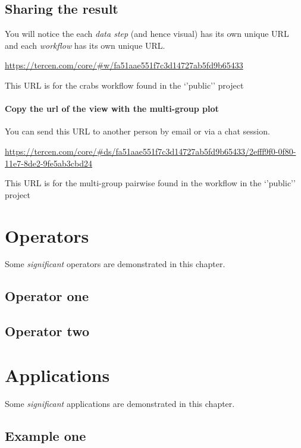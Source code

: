 \documentclass[]{book}
\theoremstyle{definition}
\theoremstyle{definition}
\theoremstyle{remark}
\begin{document}
\section{Sharing the result}\label{sharing-the-result}

You will notice the each \emph{data step} (and hence visual) has its own
unique URL and each \emph{workflow} has its own unique URL.

\url{https://tercen.com/core/\#w/fa51aae551f7c3d14727ab5fd9b65433}

This URL is for the crabs workflow found in the `'public'' project

\subsubsection{Copy the url of the view with the multi-group
plot}\label{copy-the-url-of-the-view-with-the-multi-group-plot}

You can send this URL to another person by email or via a chat session.

\url{https://tercen.com/core/\#ds/fa51aae551f7c3d14727ab5fd9b65433/2efff9f0-0f80-11e7-8de2-9fe5ab3cbd24}

This URL is for the multi-group pairwise found in the workflow in the
`'public'' project

\chapter{Operators}\label{operators}

Some \emph{significant} operators are demonstrated in this chapter.

\section{Operator one}\label{operator-one}

\section{Operator two}\label{operator-two}

\chapter{Applications}\label{applications}

Some \emph{significant} applications are demonstrated in this chapter.

\section{Example one}\label{example-one}
\end{document}
